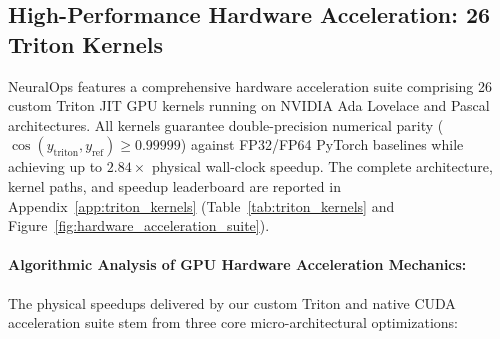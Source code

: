 \documentclass{article}
\begin{document}
\subsection{High-Performance Hardware Acceleration: 26 Triton Kernels}
NeuralOps features a comprehensive hardware acceleration suite comprising 26 custom Triton JIT GPU kernels running on NVIDIA Ada Lovelace and Pascal architectures. All kernels guarantee double-precision numerical parity ($\cos(y_{\text{triton}}, y_{\text{ref}}) \ge 0.99999$) against FP32/FP64 PyTorch baselines while achieving up to $2.84\times$ physical wall-clock speedup. The complete architecture, kernel paths, and speedup leaderboard are reported in Appendix~\ref{app:triton_kernels} (Table~\ref{tab:triton_kernels} and Figure~\ref{fig:hardware_acceleration_suite}).

\paragraph{Algorithmic Analysis of GPU Hardware Acceleration Mechanics:}
The physical speedups delivered by our custom Triton and native CUDA acceleration suite stem from three core micro-architectural optimizations:
\end{document}
